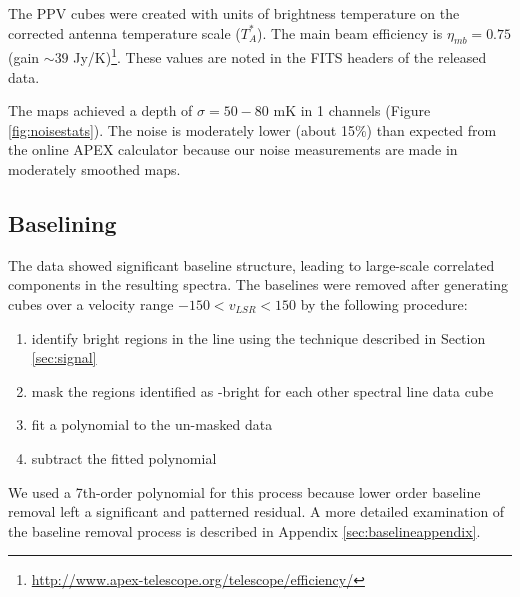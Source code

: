 
The PPV cubes were created with units of brightness temperature on the corrected
antenna temperature scale ($T_A^*$).  The
main beam efficiency is $\eta_{mb} = 0.75$ (gain $\sim39$
Jy/K)\footnote{\url{http://www.apex-telescope.org/telescope/efficiency/}}.
These values are noted in the FITS headers of the released data.

The maps achieved a depth of $\sigma=50-80$ mK in 1 \kms channels (Figure
\ref{fig:noisestats}).  The noise is moderately lower (about 15\%) than
expected from the online APEX calculator because our noise measurements are
made in moderately smoothed maps.



\subsection{Baselining}
\label{sec:baseline}
The data showed significant baseline structure, leading to large-scale
correlated components in the resulting spectra.  The baselines were removed
after generating cubes over a velocity range $-150 < v_{LSR} < 150$ \kms by the
following procedure:
\begin{enumerate}
    \item identify bright regions in the \para \threeohthree line using the
        technique described in Section \ref{sec:signal}
    \item mask the regions identified as \threeohthree-bright for each other 
        spectral line data cube
    \item fit a polynomial to the un-masked data
    \item subtract the fitted polynomial
\end{enumerate}
We used a 7th-order polynomial for this process because lower order baseline
removal left a significant and patterned residual.  A more detailed examination
of the baseline removal process is described in Appendix
\ref{sec:baselineappendix}.

